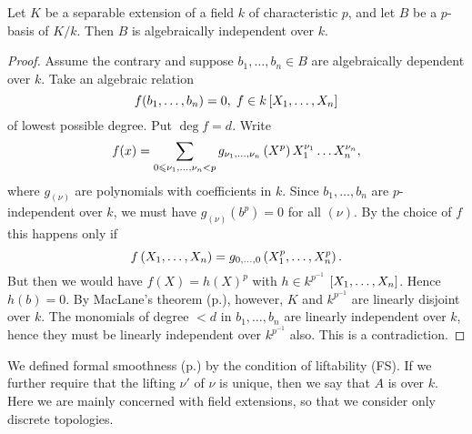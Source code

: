 \documentclass[../main]{subfiles}
\begin{document}
\begin{theorem}
\label{thm:089}
    Let $K$ be a separable extension of a field $k$ of characteristic $p$, and let $B$ be a $p$-basis of $K/k$. Then $B$ is algebraically independent over $k$. 
\end{theorem}
\begin{proof}
    Assume the contrary and suppose $b_1, \dots, b_n \in B$ are algebraically dependent over $k$. Take an algebraic relation \[f(b_1, \dots, b_n) = 0, \; f\in k\left[X_1, \dots, X_n\right]\] of lowest possible degree. Put $\deg f = d$. Write 
    \[f(x) = \sum_{0\leqslant \nu_1, \dots, \nu_n < p} g_{\nu_1, \dots, \nu_n}\left(X^p\right) X_1^{\nu_1}\dots X_n^{\nu_n},\]
    where $g_{(\nu)}$ are polynomials with coefficients in $k$. Since $b_1, \dots, b_n$ are $p$-independent over $k$, we must have $g_{(\nu)}(b^p)=0$ for all $(\nu)$. By the choice of $f$ this happens only if
    \[f\left(X_1, \dots, X_n\right) = g_{0, \dots, 0}\left(X_1^p, \dots, X_n^p\right).\]
    But then we would have $f(X) = h(X)^p$ with $h \in k^{p^{-1}}$ $\left[X_1, \dots, X_n\right]$. Hence \newline $h(b) = 0$. By MacLane's theorem (p.\pageref{exe:27.01}), however, $K$ and $k^{p^{-1}}$ are linearly disjoint over $k$. The monomials of degree $< d$ in $b_1, \dots, b_n$ are linearly independent over $k$, hence they must be linearly independent over $k^{p^{-1}}$ also. This is a contradiction. 
\end{proof}

\newparagraph
We defined formal smoothness (p.\pageref{def:28.formally smooth}) by the condition of liftability (FS). If we further require that the lifting $\nu'$ of $\nu$ is unique, then we say that $A$ is  over $k$. Here we are mainly concerned with field extensions, so that we consider only discrete topologies.
\end{document}
